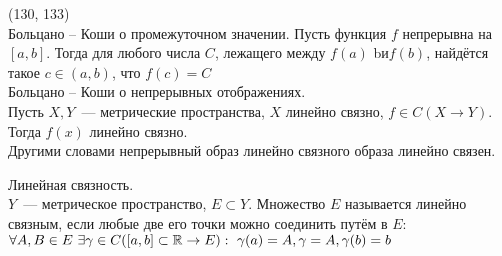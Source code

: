 (130, 133)\\
 Больцано -- Коши о промежуточном значении.
Пусть функция $f$ непрерывна на $[a, b]$. Тогда для любого числа $C$, лежащего между $f(a)$ bи$f(b)$, найдётся такое $c \in (a, b)$, что $f(c) = C$\\
 Больцано -- Коши о непрерывных отображениях.\\
Пусть $X, Y$~--- метрические пространства, $X$ линейно связно, $f \in C(X\to Y)$. Тогда $f(x)$ линейно связно.\\
Другими словами непрерывный образ линейно связного образа линейно связен.

\q Линейная связность.\\
$Y$~--- метрическое пространство, $E \subset Y$. Множество $E$ называется линейно связным, если любые две его точки можно соединить путём в $E$: $\forall A, B \in E\ \exists \gamma \in C([a, b] \subset \mathbb{R} \to E):\ \gamma(a) = A, \gamma = A, \gamma(b) = b$
